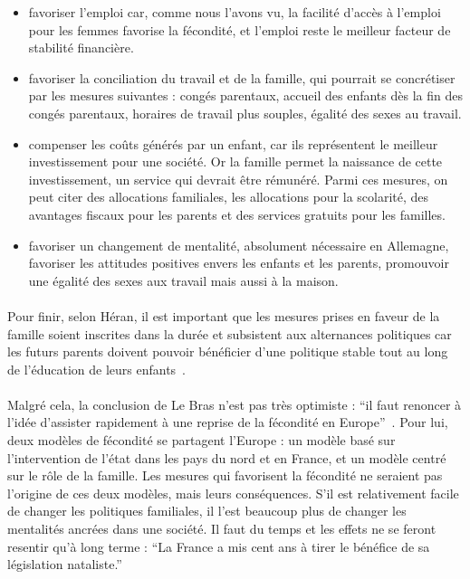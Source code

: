 \begin{itemize}
  \item favoriser l’emploi car, comme nous l’avons vu, la facilité d’accès à l'emploi pour les femmes favorise la fécondité, et l’emploi reste le meilleur facteur de stabilité financière.
  \item favoriser la conciliation du travail et de la famille, qui pourrait se concrétiser par les mesures suivantes : congés parentaux, accueil des enfants dès la fin des congés parentaux, horaires de travail plus souples, égalité des sexes au travail.
  \item compenser les coûts générés par un enfant, car ils représentent le meilleur investissement pour une société. Or la famille permet la naissance de cette investissement, un service qui devrait être rémunéré. Parmi ces mesures, on peut citer des allocations familiales, les allocations pour la scolarité, des avantages fiscaux pour les parents et des services gratuits pour les familles.
  \item favoriser un changement de mentalité, absolument nécessaire en Allemagne, favoriser les attitudes positives envers les enfants et les parents, promouvoir une égalité des sexes aux travail mais aussi à la maison. 
\end{itemize}

\paragraph{}Pour finir, selon Héran, il est important que les mesures prises en faveur de la famille soient inscrites dans la durée et subsistent aux alternances politiques car les futurs parents doivent pouvoir bénéficier d’une politique stable tout au long de l'éducation de leurs enfants~\citep[pp.14]{heran}. 

\paragraph{}Malgré cela, la conclusion de Le Bras n’est pas très optimiste : “il faut renoncer à l’idée d’assister rapidement à une reprise de la fécondité en Europe”~\citep[pp.27]{heran}. Pour lui, deux modèles de fécondité se partagent l’Europe : un modèle basé sur l’intervention de l’état dans les pays du nord et en France, et un modèle centré sur le rôle de la famille. Les mesures qui favorisent la fécondité ne seraient pas l'origine de ces deux modèles, mais leurs conséquences. S’il est relativement facile de changer les politiques familiales, il l’est beaucoup plus de changer les mentalités ancrées dans une société. Il faut du temps et les effets ne se feront resentir qu'à long terme : “La France a mis cent ans à tirer le bénéfice de sa législation nataliste.”\citep[pp.28]{heran}

